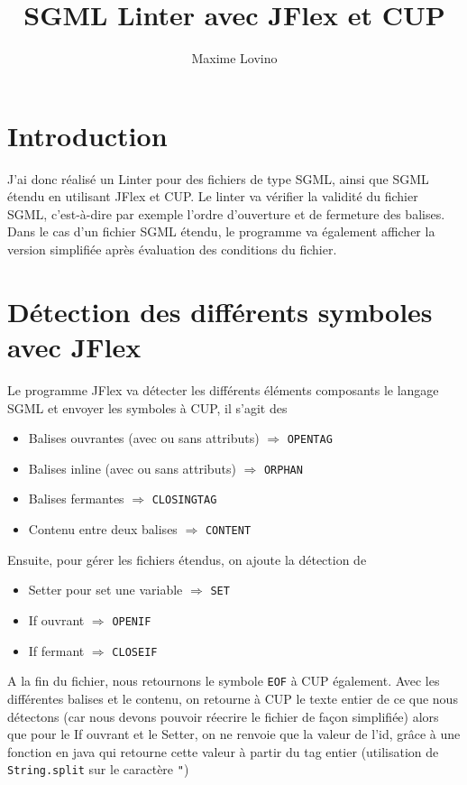 \documentclass[a4paper]{article}
\title{SGML Linter avec JFlex et CUP}
\author{Maxime Lovino}
\begin{document}
\maketitle
\newpage
\section{Introduction}
J'ai donc réalisé un Linter pour des fichiers de type SGML, ainsi que SGML étendu en utilisant JFlex et CUP. Le linter va vérifier la validité du fichier SGML, c'est-à-dire par exemple l'ordre d'ouverture et de fermeture des balises. Dans le cas d'un fichier SGML étendu, le programme va également afficher la version simplifiée après évaluation des conditions du fichier.
\section{Détection des différents symboles avec JFlex}
Le programme JFlex va détecter les différents éléments composants le langage SGML et envoyer les symboles à CUP, il s'agit des
\begin{itemize}
	\item Balises ouvrantes (avec ou sans attributs) $\Rightarrow$ \verb+OPENTAG+
	\item Balises inline (avec ou sans attributs) $\Rightarrow$ \verb+ORPHAN+
	\item Balises fermantes $\Rightarrow$ \verb+CLOSINGTAG+
	\item Contenu entre deux balises $\Rightarrow$ \verb+CONTENT+
\end{itemize}
Ensuite, pour gérer les fichiers étendus, on ajoute la détection de
\begin{itemize}
	\item Setter pour set une variable $\Rightarrow$ \verb+SET+
	\item If ouvrant $\Rightarrow$ \verb+OPENIF+
	\item If fermant $\Rightarrow$ \verb+CLOSEIF+
\end{itemize}
A la fin du fichier, nous retournons le symbole \verb+EOF+ à CUP également. Avec les différentes balises et le contenu, on retourne à CUP le texte entier de ce que nous détectons (car nous devons pouvoir réecrire le fichier de façon simplifiée) alors que pour le If ouvrant et le Setter, on ne renvoie que la valeur de l'id, grâce à une fonction en java qui retourne cette valeur à partir du tag entier (utilisation de \verb+String.split+ sur le caractère \verb+"+)
\end{document}
